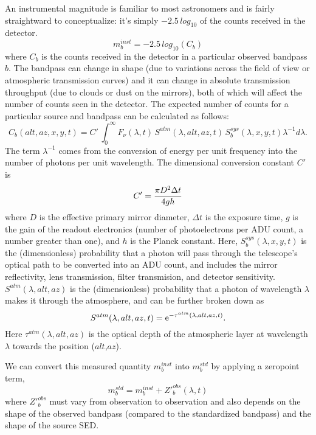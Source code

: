 \documentclass[12pt,preprint]{aastex}
\begin{document}
An instrumental magnitude is familiar to most astronomers and is fairly straightward to conceptualize:
it's simply $-2.5\,log_{10}$ of the counts received in the detector. 
\begin{equation}
m_b^{inst} = -2.5\,log_{10}(C_b)  
\end{equation}
where $C_b$ is the counts received in the detector in a particular observed bandpass $b$. The bandpass 
can change in shape (due to variations across the field of view or atmospheric transmission curves) and it can 
change in absolute transmission throughput (due to clouds or dust on the mirrors), both of which will affect the
number of counts seen in the detector.  The expected number of counts for a particular source and bandpass can be 
calculated as follows: 
\begin{equation}
\label{eqn:Fpupil2counts}
    C_b(alt, az, x,y,t) = C' \, \int_0^\infty {F_\nu(\lambda,t)  \, S^{atm}(\lambda,alt,az,t) \, S_b^{sys}(\lambda,x,y,t) \lambda^{-1}d\lambda}.
\end{equation}
The term $\lambda^{-1}$ comes from the conversion of energy per unit frequency
into the number of photons per unit wavelength. The dimensional conversion constant $C'$ is
\begin{equation}
\label{eqn:Cconstant}
        C' = {\pi D^2 \Delta t \over 4 g h }  
\end{equation}
where $D$ is the effective primary mirror diameter, $\Delta t$ is the
exposure time, $g$ is the gain of the readout electronics (number of
photoelectrons per ADU count, a number greater than one), and $h$ is
the Planck constant. 
Here, $S_b^{sys}(\lambda,x,y,t)$ is the (dimensionless) probability that a photon will pass through the telescope's optical path to be converted into an ADU count, and includes the mirror reflectivity, lens transmission, filter transmision, and detector sensitivity.  $S^{atm}(\lambda,alt,az)$ is the (dimensionless) probability that a photon of wavelength $\lambda$ makes it through the atmosphere, and can be further broken down as
\begin{equation}
\label{eqn:atmTau}
   S^{atm}(\lambda,alt,az,t)   = {\rm e}^{-\tau^{atm}(\lambda,alt,az,t)}.
\end{equation}
Here $\tau^{atm}(\lambda,alt,az)$ is the optical depth of the
atmospheric layer at wavelength $\lambda$ towards the position
($alt$,$az$).

We can convert this measured quantity $m_b^{inst}$ into $m_b^{std}$ by applying a zeropoint term, 
\begin{equation}
\label{eqn:instMag}
m_b^{std} = m_b^{inst} + {Z'}_b^{obs}(\lambda, t)
\end{equation}
where ${Z'}_b^{obs}$ must vary from observation to observation and also depends on the shape of the 
observed bandpass (compared to the standardized bandpass) and the shape of the source SED. 
\end{document}
